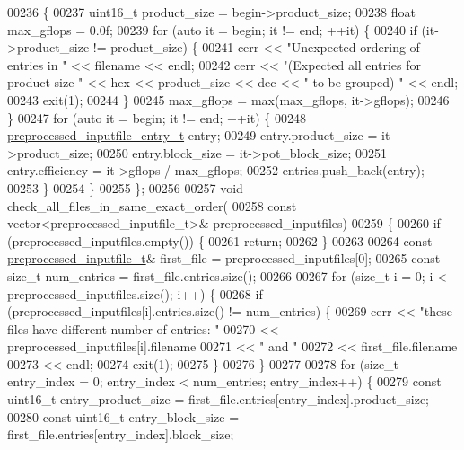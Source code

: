 \begin{DoxyCode}
{{00236   \{
00237     uint16\_t product\_size = begin->product\_size;
00238     \textcolor{keywordtype}{float} max\_gflops = 0.0f;
00239     \textcolor{keywordflow}{for} (\textcolor{keyword}{auto} it = begin; it != end; ++it) \{
00240       \textcolor{keywordflow}{if} (it->product\_size != product\_size) \{
00241         cerr << \textcolor{stringliteral}{"Unexpected ordering of entries in "} << filename << endl;
00242         cerr << \textcolor{stringliteral}{"(Expected all entries for product size "} << hex << product\_size << dec << \textcolor{stringliteral}{" to be grouped)
      "} << endl;
00243         exit(1);
00244       \}
00245       max\_gflops = max(max\_gflops, it->gflops);
00246     \}
00247     \textcolor{keywordflow}{for} (\textcolor{keyword}{auto} it = begin; it != end; ++it) \{
00248       \hyperlink{structpreprocessed__inputfile__entry__t}{preprocessed\_inputfile\_entry\_t} entry;
00249       entry.product\_size = it->product\_size;
00250       entry.block\_size = it->pot\_block\_size;
00251       entry.efficiency = it->gflops / max\_gflops;
00252       entries.push\_back(entry);
00253     \}
00254   \}
00255 \};
00256 
00257 \textcolor{keywordtype}{void} check\_all\_files\_in\_same\_exact\_order(
00258        \textcolor{keyword}{const} vector<preprocessed\_inputfile\_t>& preprocessed\_inputfiles)
00259 \{
00260   \textcolor{keywordflow}{if} (preprocessed\_inputfiles.empty()) \{
00261     \textcolor{keywordflow}{return};
00262   \}
00263 
00264   \textcolor{keyword}{const} \hyperlink{structpreprocessed__inputfile__t}{preprocessed\_inputfile\_t}& first\_file = preprocessed\_inputfiles[0];
00265   \textcolor{keyword}{const} \textcolor{keywordtype}{size\_t} num\_entries = first\_file.entries.size();
00266 
00267   \textcolor{keywordflow}{for} (\textcolor{keywordtype}{size\_t} i = 0; i < preprocessed\_inputfiles.size(); i++) \{
00268     \textcolor{keywordflow}{if} (preprocessed\_inputfiles[i].entries.size() != num\_entries) \{
00269       cerr << \textcolor{stringliteral}{"these files have different number of entries: "}
00270            << preprocessed\_inputfiles[i].filename
00271            << \textcolor{stringliteral}{" and "}
00272            << first\_file.filename
00273            << endl;
00274       exit(1);
00275     \}
00276   \}
00277 
00278   \textcolor{keywordflow}{for} (\textcolor{keywordtype}{size\_t} entry\_index = 0; entry\_index < num\_entries; entry\_index++) \{
00279     \textcolor{keyword}{const} uint16\_t entry\_product\_size = first\_file.entries[entry\_index].product\_size;
00280     \textcolor{keyword}{const} uint16\_t entry\_block\_size = first\_file.entries[entry\_index].block\_size;
}}
\end{DoxyCode}
